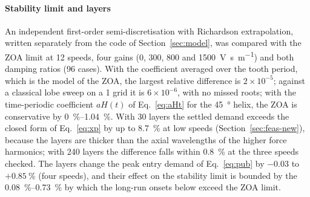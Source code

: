 \paragraph{Stability limit and layers}
An independent first-order semi-discretisation \citep{insperger2002semi,insperger2004updated,insperger2011book} with Richardson extrapolation, written separately from the code of Section~\ref{sec:model}, was compared with the ZOA limit at 12 speeds, four gains (0, 300, 800 and \SI{1500}{\volt\second\per\metre}) and both damping ratios (96 cases). With the coefficient averaged over the tooth period, which is the model of the ZOA, the largest relative difference is $2\times10^{-5}$; against a classical lobe sweep on a \SI{1}{\rpm} grid it is $6\times10^{-6}$, with no missed roots; with the time-periodic coefficient $aH(t)$ of Eq.~\eqref{eq:aHt} for the \SI{45}{\degree} helix, the ZOA is conservative by \SIrange{0}{1.04}{\percent}. With 30 layers the settled demand exceeds the closed form of Eq.~\eqref{eq:xp} by up to \SI{8.7}{\percent} at low speeds (Section~\ref{sec:feas-new}), because the layers are thicker than the axial wavelengths of the higher force harmonics; with 240 layers the difference falls within \SI{0.8}{\percent} at the three speeds checked. The layers change the peak entry demand of Eq.~\eqref{eq:pub} by $-0.03$ to $+\SI{0.85}{\percent}$ (four speeds), and their effect on the stability limit is bounded by the \SIrange{0.08}{0.73}{\percent} by which the long-run onsets below exceed the ZOA limit.

